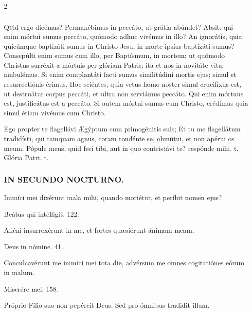 \documentclass[9pt,twoside]{extarticle}
\begin{document}
\begin{multicols}{2}
\subsubsection*{\center{}}
\lettrine{Q}uid ergo dicémus? Permanébimus in peccáto, ut grátia abúndet? Absit: qui enim mórtui sumus peccáto, quómodo adhuc vivémus in illo? An ignorátis, quia quicúmque baptizáti sumus in Christo Jesu, in morte ipsíus baptizáti sumus? Consepúlti enim sumus cum illo, per Baptísmum, in mortem: ut quómodo Christus surréxit a mórtuis per glóriam Patris; ita et nos in novitáte vitæ ambulémus. Si enim complantáti facti sumus similitúdini mortis ejus; simul et resurrectiónis érimus. Hoc sciéntes, quia vetus homo noster simul crucifíxus est, ut destruátur corpus peccáti, et ultra non serviámus peccáto. Qui enim mórtuus est, justificátus est a peccáto. Si autem mórtui sumus cum Christo, crédimus quia simul étiam vivémus cum Christo.

\begin{tightlist}{}
\item {} Ego propter te flagellávi Ægýptum cum primogénitis suis; \textred{*} Et tu me flagellátum tradidísti, qui tamquam agnus, coram tondénte se, obmútui, et non apérui os meum.  Pópule meus, quid feci tibi, aut in quo contristávi te? respónde mihi. t.  Glória Patri. t.
\end{tightlist}

\subsubsection*{\center \textsc{IN SECUNDO NOCTURNO.}}
\begin{tightlist}{}
\item {} Inimíci mei dixérunt mala mihi, quando moriétur, et períbit nomen ejus?
\item {} Beátus qui intélligit. 122.
\item {} Aliéni insurrexérunt in me, et fortes quæsiérunt ánimam meam.
\item {} Deus in nómine. 41.
\item {} Conculcavérunt me inimíci mei tota die, advérsum me omnes cogitatiónes eórum in malum.
\item {} Miserére mei. 158.
\item {} Próprio Fílio suo non pepércit Deus.  Sed pro ómnibus tradidit illum.
\end{tightlist}


\end{multicols}
\end{document}
